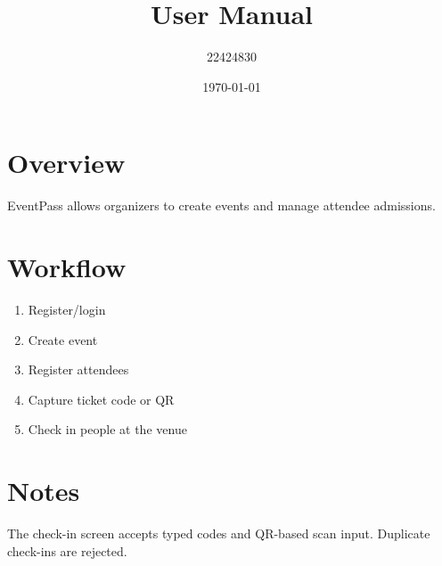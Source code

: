\documentclass[11pt]{article}
\begin{document}
\title{User Manual}
\author{22424830}
\date{\today}
\maketitle
\section{Overview}
EventPass allows organizers to create events and manage attendee admissions.
\section{Workflow}
\begin{enumerate}
  \item Register/login
  \item Create event
  \item Register attendees
  \item Capture ticket code or QR
  \item Check in people at the venue
\end{enumerate}
\section{Notes}
The check-in screen accepts typed codes and QR-based scan input. Duplicate check-ins are rejected.
\end{document}
